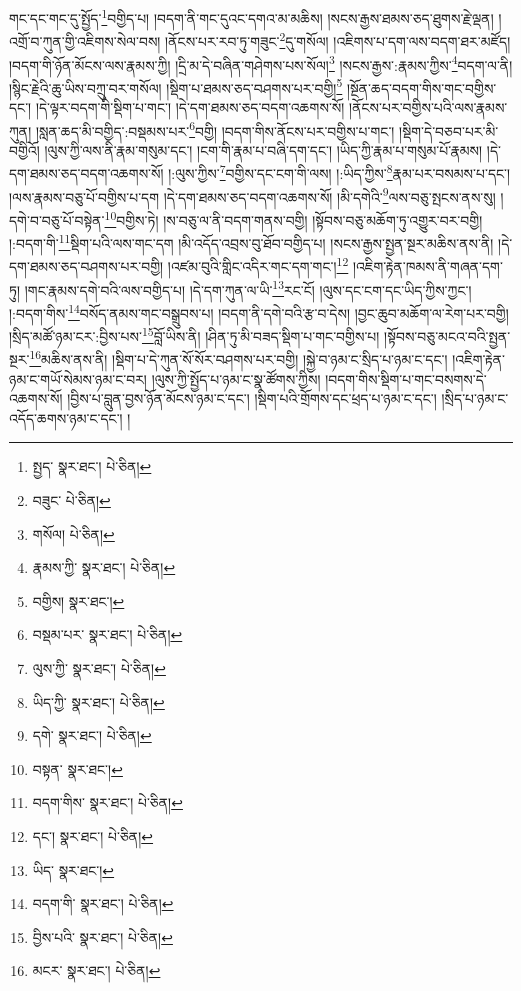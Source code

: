 གང་དང་གང་དུ་སྤྱོད་\footnote{སྤྱད་  སྣར་ཐང་།  པེ་ཅིན། }བགྱིད་པ། །བདག་ནི་གང་དུའང་དགའ་མ་མཆིས། །སངས་རྒྱས་ཐམས་ཅད་ཐུགས་རྗེ་ལྡན། །འགྲོ་བ་ཀུན་གྱི་འཇིགས་སེལ་བས། །ནོངས་པར་རབ་ཏུ་གཟུང་\footnote{བཟུང་  པེ་ཅིན། }དུ་གསོལ། །འཇིགས་པ་དག་ལས་བདག་ཐར་མཛོད། །བདག་གི་ཉོན་མོངས་ལས་རྣམས་ཀྱི། །དྲི་མ་དེ་བཞིན་གཤེགས་པས་སོལ།\footnote{གསོལ།  པེ་ཅིན། } །སངས་རྒྱས་:རྣམས་ཀྱིས་\footnote{རྣམས་ཀྱི་  སྣར་ཐང་།  པེ་ཅིན། }བདག་ལ་ནི། །སྙིང་རྗེའི་ཆུ་ཡིས་བཀྲུ་བར་གསོལ། །སྡིག་པ་ཐམས་ཅད་བཤགས་པར་བགྱི།\footnote{བགྱིས།  སྣར་ཐང་། } །སྔོན་ཆད་བདག་གིས་གང་བགྱིས་དང་། །དེ་ལྟར་བདག་གི་སྡིག་པ་གང་། །དེ་དག་ཐམས་ཅད་བདག་འཆགས་སོ། །ནོངས་པར་བགྱིས་པའི་ལས་རྣམས་ཀུན། །སླན་ཆད་མི་བགྱིད་:བསྡམས་པར་\footnote{བསྡམ་པར་  སྣར་ཐང་།  པེ་ཅིན། }བགྱི། །བདག་གིས་ནོངས་པར་བགྱིས་པ་གང་། །སྡིག་དེ་བཅབ་པར་མི་བགྱིའོ། །ལུས་ཀྱི་ལས་ནི་རྣམ་གསུམ་དང་། །ངག་གི་རྣམ་པ་བཞི་དག་དང་། །ཡིད་ཀྱི་རྣམ་པ་གསུམ་པོ་རྣམས། །དེ་དག་ཐམས་ཅད་བདག་འཆགས་སོ། །:ལུས་ཀྱིས་\footnote{ལུས་ཀྱི་  སྣར་ཐང་།  པེ་ཅིན། }བགྱིས་དང་ངག་གི་ལས། །:ཡིད་ཀྱིས་\footnote{ཡིད་ཀྱི་  སྣར་ཐང་།  པེ་ཅིན། }རྣམ་པར་བསམས་པ་དང་། །ལས་རྣམས་བཅུ་པོ་བགྱིས་པ་དག །དེ་དག་ཐམས་ཅད་བདག་འཆགས་སོ། །མི་དགེའི་\footnote{དགེ་  སྣར་ཐང་།  པེ་ཅིན། }ལས་བཅུ་སྤངས་ནས་སུ། །དགེ་བ་བཅུ་པོ་བསྟེན་\footnote{བསྟན་  སྣར་ཐང་། }བགྱིས་ཏེ། །ས་བཅུ་ལ་ནི་བདག་གནས་བགྱི། །སྟོབས་བཅུ་མཆོག་ཏུ་འགྱུར་བར་བགྱི། །:བདག་གི་\footnote{བདག་གིས་  སྣར་ཐང་།  པེ་ཅིན། }སྡིག་པའི་ལས་གང་དག །མི་འདོད་འབྲས་བུ་ཐོབ་བགྱིད་པ། །སངས་རྒྱས་སྤྱན་སྔར་མཆིས་ནས་ནི། །དེ་དག་ཐམས་ཅད་བཤགས་པར་བགྱི། །འཛམ་བུའི་གླིང་འདིར་གང་དག་གང་།\footnote{དང་།  སྣར་ཐང་།  པེ་ཅིན། } །འཇིག་རྟེན་ཁམས་ནི་གཞན་དག་ཏུ། །གང་རྣམས་དགེ་བའི་ལས་བགྱིད་པ། །དེ་དག་ཀུན་ལ་ཡི་\footnote{ཡིད་  སྣར་ཐང་། }རང་ངོ། །ལུས་དང་ངག་དང་ཡིད་ཀྱིས་ཀྱང་། །:བདག་གིས་\footnote{བདག་གི་  སྣར་ཐང་།  པེ་ཅིན། }བསོད་ནམས་གང་བསྒྲུབས་པ། །བདག་ནི་དགེ་བའི་རྩ་བ་དེས། །བྱང་ཆུབ་མཆོག་ལ་རེག་པར་བགྱི། །སྲིད་མཚོ་ཉམ་ངར་:བྱིས་པས་\footnote{བྱིས་པའི་  སྣར་ཐང་།  པེ་ཅིན། }བློ་ཡིས་ནི། །ཤིན་ཏུ་མི་བཟད་སྡིག་པ་གང་བགྱིས་པ། །སྟོབས་བཅུ་མངའ་བའི་སྤྱན་སྔར་\footnote{མངར་  སྣར་ཐང་།  པེ་ཅིན། }མཆིས་ནས་ནི། །སྡིག་པ་དེ་ཀུན་སོ་སོར་བཤགས་པར་བགྱི། །སྐྱེ་བ་ཉམ་ང་སྲིད་པ་ཉམ་ང་དང་། །འཇིག་རྟེན་ཉམ་ང་གཡོ་སེམས་ཉམ་ང་བར། །ལུས་ཀྱི་སྤྱོད་པ་ཉམ་ང་སྣ་ཚོགས་ཀྱིས། །བདག་གིས་སྡིག་པ་གང་བསགས་དེ་འཆགས་སོ། །བྱིས་པ་བླུན་བྱས་ཉོན་མོངས་ཉམ་ང་དང་། །སྡིག་པའི་གྲོགས་དང་ཕྲད་པ་ཉམ་ང་དང་། །སྲིད་པ་ཉམ་ང་འདོད་ཆགས་ཉམ་ང་དང་། །
